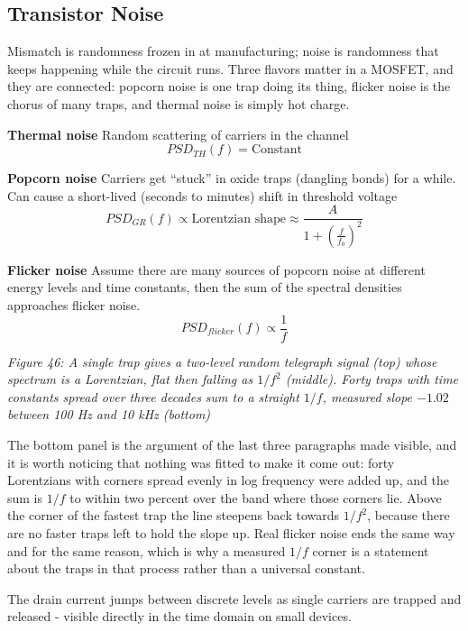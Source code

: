 \subsection{Transistor Noise}\label{transistor-noise}

Mismatch is randomness frozen in at manufacturing; noise is randomness
that keeps happening while the circuit runs. Three flavors matter in a
MOSFET, and they are connected: popcorn noise is one trap doing its
thing, flicker noise is the chorus of many traps, and thermal noise is
simply hot charge.

\textbf{Thermal noise} Random scattering of carriers in the channel
\[ PSD_{TH}(f) = \text{Constant}\]

\textbf{Popcorn noise} Carriers get ``stuck'' in oxide traps (dangling
bonds) for a while. Can cause a short-lived (seconds to minutes) shift
in threshold voltage
\[ PSD_{GR}(f) \propto \text{Lorentzian shape} \approx \frac{A}{1 + \left(\frac{f}{f_0}\right)^2}\]

\textbf{Flicker noise} Assume there are many sources of popcorn noise at
different energy levels and time constants, then the sum of the spectral
densities approaches flicker noise.
\[ PSD_{flicker}(f) \propto \frac{1}{f} \]


{
\centering
{}
}

\emph{Figure 46: A single trap gives a two-level random telegraph signal
(top) whose spectrum is a Lorentzian, flat then falling as \(1/f^2\)
(middle). Forty traps with time constants spread over three decades sum
to a straight \(1/f\), measured slope \(-1.02\) between 100 Hz and 10
kHz (bottom)}

The bottom panel is the argument of the last three paragraphs made
visible, and it is worth noticing that nothing was fitted to make it
come out: forty Lorentzians with corners spread evenly in log frequency
were added up, and the sum is \(1/f\) to within two percent over the
band where those corners lie. Above the corner of the fastest trap the
line steepens back towards \(1/f^2\), because there are no faster traps
left to hold the slope up. Real flicker noise ends the same way and for
the same reason, which is why a measured \(1/f\) corner is a statement
about the traps in that process rather than a universal constant.

The drain current jumps between discrete levels as single carriers are
trapped and released - visible directly in the time domain on small
devices.

